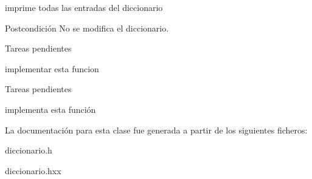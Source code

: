 imprime todas las entradas del diccionario 

\begin{DoxyPostcond}{Postcondición}
No se modifica el diccionario. 
\end{DoxyPostcond}
\begin{DoxyRefDesc}{Tareas pendientes}
\item[\hyperlink{todo__todo000001}{Tareas pendientes}]implementar esta funcion \end{DoxyRefDesc}


\begin{DoxyRefDesc}{Tareas pendientes}
\item[\hyperlink{todo__todo000011}{Tareas pendientes}]implementa esta función \end{DoxyRefDesc}


La documentación para esta clase fue generada a partir de los siguientes ficheros\-:\begin{DoxyCompactItemize}
\item 
diccionario.\-h\item 
diccionario.\-hxx\end{DoxyCompactItemize}
